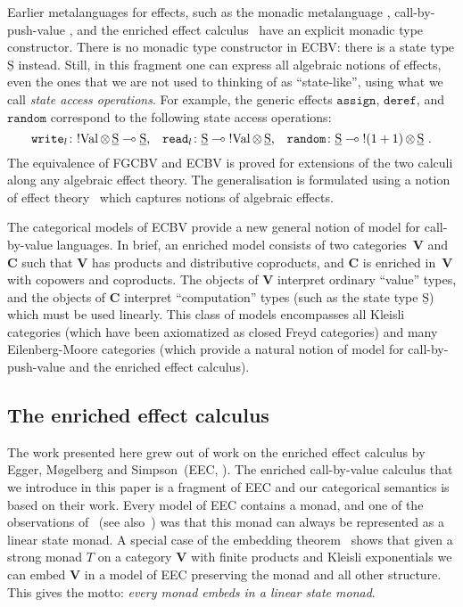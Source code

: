 \documentclass{LMCS}
\newcommand{\val}{\mathrm{Val}}
\newcommand{\geffrandom}{\codefont{random}}
\newcommand{\geffreadcell}[1]{\codefont{deref}}
\newcommand{\geffwritecell}[1]{\codefont{assign}}
\newcommand{\saccrandom}{\codefont{random}}
\newcommand{\saccreadcell}[1]{\codefont{read}_{#1}}
\newcommand{\saccwritecell}[1]{\codefont{write}_{#1}}
\newcommand{\codefont}[1]{\mathtt{#1}}
\newcommand{\co}{\colon}
\newcommand{\tensor}{\otimes}
\newcommand{\ltensortype}[2]{{!} #1 \, {\tensor} \, #2}
\newcommand{\lfun}{\multimap}
\newcommand{\FGCBV}{FGCBV}
\newcommand{\ECBV}{ECBV}
\newcommand{\VCat}{\fixedcatfont{V}} \newcommand{\CCat}{\fixedcatfont{C}} \newcommand{\DCat}{\fixedcatfont{D}}
\newcommand{\fixedcatfont}{\mathbf}
\newcommand{\states}{{\underline{\mathrm{S}}}}
\begin{document}
{Earlier metalanguages for effects, such as the monadic metalanguage
\cite{Moggi:91}, call-by-push-value \cite{Levy:book}, and the enriched
effect calculus~\cite{Mogelberg:CSL:09} have an explicit
monadic type constructor.  There is no monadic type constructor in
ECBV: there is a state type $\states$ instead. Still, in this
fragment one can express all algebraic notions of effects, even the
ones that we are not used to thinking of as ``state-like'', using what we
call \emph{state access operations}.  For example, the generic effects
$\geffwritecell{l}$, $\geffreadcell{l}$, and $\geffrandom$ correspond
to the following state access operations:
\begin{equation}
\label{eqn:saccs}
\saccwritecell{l} \co \ltensortype{\val}{\states} \lfun \states\text,
\quad\saccreadcell{l} \co  \states \lfun \ltensortype{\val}{\states}\text,
\quad
\saccrandom \co \states \lfun \ltensortype{(1+1)}{\states}\ \text.
\end{equation}
The equivalence of {\FGCBV} and {\ECBV} is proved for extensions of the two calculi along any algebraic effect theory. The generalisation is formulated using a notion of effect theory~\cite{Plotkin:Pretnar:08} which captures notions of algebraic effects.

The categorical models of {\ECBV} provide a new general notion of
model for call-by-value languages. In brief, an enriched model
consists of two categories~$\VCat$ and $\CCat$ such that $\VCat$ has
products and distributive coproducts, and $\CCat$ is enriched in~$\VCat$
with copowers and coproducts. The objects of $\VCat$ interpret ordinary
``value'' types, and the objects of $\CCat$ interpret ``computation''
types (such as the state type $\states$) which must be used linearly.
This class of models encompasses all Kleisli categories 
(which have been axiomatized as closed Freyd categories) and
many Eilenberg-Moore categories (which provide a natural notion of
model for call-by-push-value and the enriched effect calculus).
}

\subsection{The enriched effect calculus}
The work presented here grew out of work on the enriched effect calculus by 
Egger, M\o gelberg and Simpson~(EEC, \cite{EEC:journal,Mogelberg:CSL:09,Mogelberg:fossacs:10,EEC:LCPS:journal}). 
The enriched call-by-value calculus that we introduce in this paper is
a fragment of EEC 
and our categorical semantics is based on their work. 
Every model of EEC contains a monad, and one of the observations of~\cite{Mogelberg:fossacs:10} (see also~\cite[Example~4.2]{EEC:journal})
was that this monad can always be represented as a linear state monad.
A special case of the embedding theorem~\cite[Theorem~4]{Mogelberg:CSL:09} 
shows that given a strong monad $T$ on a category $\VCat$ with finite products and 
Kleisli exponentials we can embed $\VCat$ in a model of EEC preserving the monad 
and all other structure. This 
gives the motto: \emph{every monad embeds in a linear state monad}.
\end{document}
